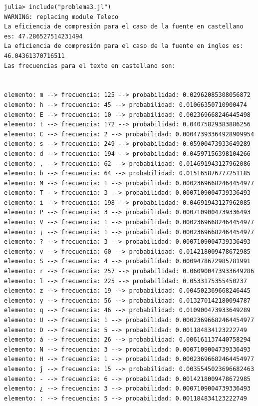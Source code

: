 \documentclass[10pt]{article}
\begin{document}
\begin{verbatim}
julia> include("problema3.jl")
WARNING: replacing module Teleco
La eficiencia de compresión para el caso de la fuente en castellano es: 47.286527514231494
La eficiencia de compresión para el caso de la fuente en ingles es: 46.04361370716511
Las frecuencias para el texto en castellano son:


elemento: m --> frecuencia: 125 --> probabilidad: 0.02962085308056872
elemento: h --> frecuencia: 45 --> probabilidad: 0.01066350710900474
elemento: E --> frecuencia: 10 --> probabilidad: 0.002369668246445498
elemento: t --> frecuencia: 172 --> probabilidad: 0.04075829383886256
elemento: C --> frecuencia: 2 --> probabilidad: 0.00047393364928909954
elemento: s --> frecuencia: 249 --> probabilidad: 0.05900473933649289
elemento: d --> frecuencia: 194 --> probabilidad: 0.04597156398104266
elemento: , --> frecuencia: 62 --> probabilidad: 0.014691943127962086
elemento: b --> frecuencia: 64 --> probabilidad: 0.015165876777251185
elemento: M --> frecuencia: 1 --> probabilidad: 0.00023696682464454977
elemento: T --> frecuencia: 3 --> probabilidad: 0.0007109004739336493
elemento: i --> frecuencia: 198 --> probabilidad: 0.04691943127962085
elemento: P --> frecuencia: 3 --> probabilidad: 0.0007109004739336493
elemento: V --> frecuencia: 1 --> probabilidad: 0.00023696682464454977
elemento: ¡ --> frecuencia: 1 --> probabilidad: 0.00023696682464454977
elemento: ? --> frecuencia: 3 --> probabilidad: 0.0007109004739336493
elemento: v --> frecuencia: 60 --> probabilidad: 0.014218009478672985
elemento: S --> frecuencia: 4 --> probabilidad: 0.0009478672985781991
elemento: r --> frecuencia: 257 --> probabilidad: 0.060900473933649286
elemento: l --> frecuencia: 225 --> probabilidad: 0.0533175355450237
elemento: z --> frecuencia: 19 --> probabilidad: 0.004502369668246445
elemento: y --> frecuencia: 56 --> probabilidad: 0.013270142180094787
elemento: q --> frecuencia: 46 --> probabilidad: 0.010900473933649289
elemento: U --> frecuencia: 1 --> probabilidad: 0.00023696682464454977
elemento: D --> frecuencia: 5 --> probabilidad: 0.001184834123222749
elemento: á --> frecuencia: 26 --> probabilidad: 0.006161137440758294
elemento: N --> frecuencia: 3 --> probabilidad: 0.0007109004739336493
elemento: H --> frecuencia: 1 --> probabilidad: 0.00023696682464454977
elemento: j --> frecuencia: 15 --> probabilidad: 0.0035545023696682463
elemento: - --> frecuencia: 6 --> probabilidad: 0.0014218009478672985
elemento: ¿ --> frecuencia: 3 --> probabilidad: 0.0007109004739336493
elemento: : --> frecuencia: 5 --> probabilidad: 0.001184834123222749

\end{verbatim}
\end{document}
